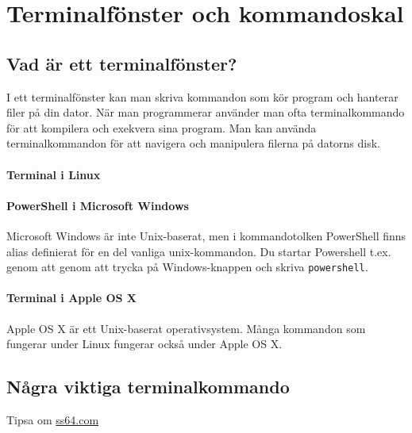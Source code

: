 
\chapter{Terminalfönster och kommandoskal}\label{appendix:terminal}

\section{Vad är ett terminalfönster?}

I ett terminalfönster kan man skriva kommandon som kör program och hanterar filer på din dator. När man programmerar använder man ofta terminalkommando för att kompilera och exekvera sina program. Man kan använda terminalkommandon för att navigera och manipulera filerna på datorns disk.  
 
\subsubsection{Terminal i Linux}

\subsubsection{PowerShell i Microsoft Windows}
Microsoft Windows är inte Unix-baserat, men i kommandotolken PowerShell finns alias definierat för en del vanliga unix-kommandon. Du startar Powershell t.ex. genom att genom att trycka på Windows-knappen och skriva \texttt{powershell}.

\subsubsection{Terminal i Apple OS X}
Apple OS X är ett Unix-baserat operativsystem. Många kommandon som fungerar under Linux fungerar också under Apple OS X.

\section{Några viktiga terminalkommando}

Tipsa om \href{http://ss64.com/}{ss64.com}